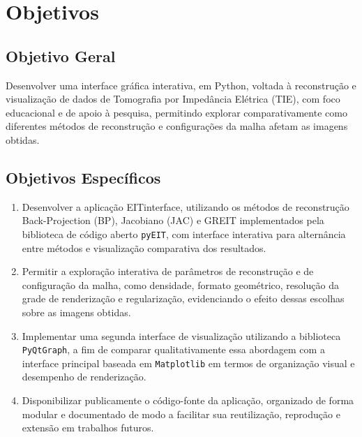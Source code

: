 
\chapter{Objetivos}

\section{Objetivo Geral}

Desenvolver uma interface gráfica interativa, em Python, voltada à reconstrução e visualização de dados de Tomografia por Impedância Elétrica (TIE), com foco educacional e de apoio à pesquisa, permitindo explorar comparativamente como diferentes métodos de reconstrução e configurações da malha afetam as imagens obtidas.

\section{Objetivos Específicos}

\begin{enumerate}

\item Desenvolver a aplicação EITinterface, utilizando os métodos de reconstrução Back-Projection (BP), Jacobiano (JAC) e GREIT implementados pela biblioteca de código aberto \texttt{pyEIT}, com interface interativa para alternância entre métodos e visualização comparativa dos resultados.

\item Permitir a exploração interativa de parâmetros de reconstrução e de configuração da malha, como densidade, formato geométrico, resolução da grade de renderização e regularização, evidenciando o efeito dessas escolhas sobre as imagens obtidas.

\item Implementar uma segunda interface de visualização utilizando a biblioteca \texttt{PyQtGraph}, a fim de comparar qualitativamente essa abordagem com a interface principal baseada em \texttt{Matplotlib} em termos de organização visual e desempenho de renderização.

\item Disponibilizar publicamente o código-fonte da aplicação, organizado de forma modular e documentado de modo a facilitar sua reutilização, reprodução e extensão em trabalhos futuros.

\end{enumerate}